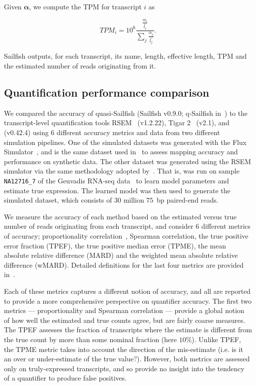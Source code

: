 Given $\bm{\alpha}$, we compute the TPM for transcript $i$ as

\begin{equation}
  TPM_i = 10^6 \frac{\frac{\alpha_i}{\hat{l_i}}}{\sum_{j}\frac{\alpha_j}{\hat{l_j}}}.
\label{eqn:tpm}
\end{equation}

Sailfish outputs, for each transcript, its name, length, effective length, TPM and the estimated number of reads originating from it.

\subsection{Quantification performance comparison}
\label{subsec:quant_compare}

We compared the accuracy of quasi-Sailfish (Sailfish v0.9.0; q-Sailfish in~) to the transcript-level quantification tools RSEM~\citep{li2010rna} (v1.2.22), Tigar 2~\citep{tigar2} (v2.1), and \kallisto~\citep{Bray:2015:Kallisto} (v0.42.4) using 6 different accuracy metrics and data from two different simulation pipelines. One of the simulated datasets was generated with the Flux Simulator~\citep{fluxsim}, and is the same dataset used in~ to assess mapping accuracy and performance on synthetic data.  The other dataset was generated using the RSEM simulator via the same methodology adopted by~\citet{Bray:2015:Kallisto}.  That is,  was run on sample \texttt{NA12716\_7} of the Geuvadis RNA-seq data~\citep{Lappalainen2013Transcriptome} to learn model parameters and estimate true expression. The learned model was then used to generate the simulated dataset, which consists of $30$ million $75$~bp paired-end reads.

We measure the accuracy of each method based on the estimated versus true number of reads originating from each transcript, and consider 6 different metrics of accuracy; proportionality correlation~\citep{Lovell2015Proportionality}, Spearman correlation, the true positive error fraction (TPEF), the true positive median error (TPME), the mean absolute relative difference (MARD) and the weighted mean absolute relative difference (wMARD). Detailed definitions for the last four metrics are provided in~. 

Each of these metrics captures a different notion of accuracy, and all are reported to provide a more comprehensive perspective on quantifier accuracy.  The first two metrics --- proportionality and Spearman correlation --- provide a global notion of how well the estimated and true counts agree, but are fairly coarse measures. The TPEF assesses the fraction of transcripts where the estimate is different from the true count by more than some nominal fraction (here $10\%$).  Unlike TPEF, the TPME metric takes into account the direction of the mis-estimate (i.e. is it an over or under-estimate of the true value?).  However, both metrics are assessed only on truly-expressed transcripts, and so provide no insight into the tendency of a quantifier to produce false positives.

